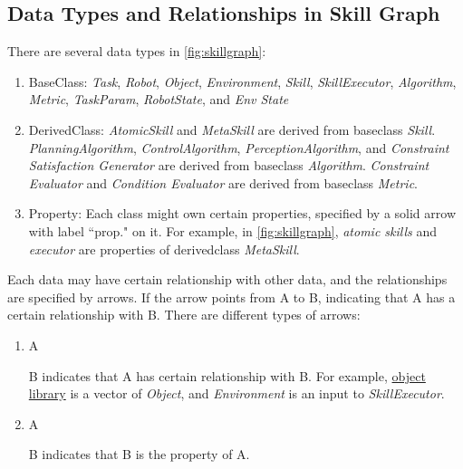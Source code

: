 \documentclass{article}
\begin{document}
\subsection{Data Types and Relationships in Skill Graph}
There are several data types in \cref{fig:skillgraph}:
\begin{enumerate}
    \item BaseClass: \textit{Task}, \textit{Robot}, \textit{Object}, \textit{Environment}, \textit{Skill}, \textit{SkillExecutor}, \textit{Algorithm}, \textit{Metric}, \textit{TaskParam}, \textit{RobotState}, and \textit{Env State} 
    
    \item DerivedClass: \textit{AtomicSkill} and \textit{MetaSkill} are derived from baseclass \textit{Skill}. \textit{PlanningAlgorithm}, \textit{ControlAlgorithm}, \textit{PerceptionAlgorithm}, and \textit{Constraint Satisfaction Generator} are derived from baseclass \textit{Algorithm}. \textit{Constraint Evaluator} and \textit{Condition Evaluator} are derived from baseclass \textit{Metric}.
    
    \item Property: Each class might own certain properties, specified by a solid arrow with label ``prop." on it. For example, in \cref{fig:skillgraph}, \textit{atomic skills} and \textit{executor} are properties of derivedclass \textit{MetaSkill}. 
\end{enumerate}

Each data may have certain relationship with other data, and the relationships are specified by arrows. If the arrow points from A to B, indicating that A has a certain relationship with B. There are different types of arrows:
\begin{enumerate}
\item A  B
indicates that A has certain relationship with B. For example, \underline{object library} is a vector of \textit{Object}, and \textit{Environment} is an input to \textit{SkillExecutor}.

\item A  B
indicates that B is the property of A.
\end{enumerate}
\end{document}
